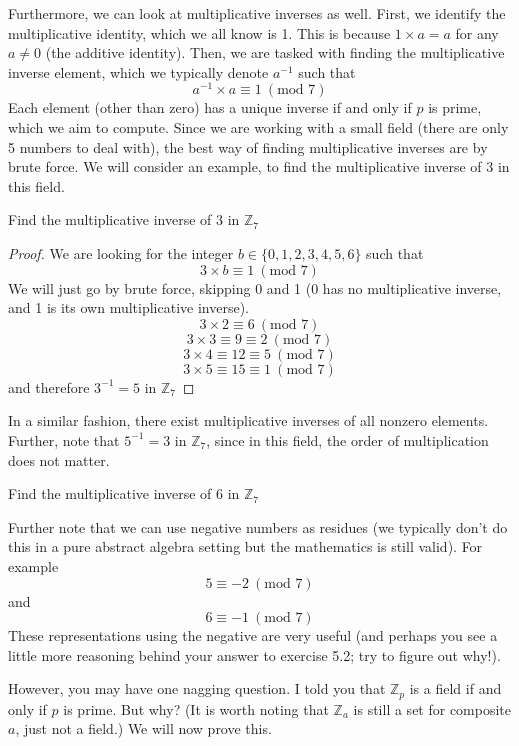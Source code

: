 Furthermore, we can look at multiplicative inverses as well. First, we identify the multiplicative identity, which we all know is 1. This is because $1 \times a = a$ for any $a \neq 0$ (the additive identity). Then, we are tasked with finding the multiplicative inverse element, which we typically denote $a^{-1}$ such that 
\[
a^{-1} \times a \equiv 1 ~ (\text{mod }7)
\]
Each element (other than zero) has a unique inverse if and only if  $p$ is prime, which we aim to compute. Since we are working with a small field (there are only 5 numbers to deal with), the best way of finding multiplicative inverses are by brute force. We will consider an example, to find the multiplicative inverse of $3$ in this field.

\begin{example}
    Find the multiplicative inverse of $3$ in $\mathbb{Z}_7$
\end{example}
\begin{proof}
    We are looking for the integer $b \in \{0, 1, 2, 3, 4, 5, 6\}$ such that 
    \[
    3 \times b \equiv 1~ (\text{mod }7)
    \]
    We will just go by brute force, skipping 0 and 1 (0 has no multiplicative inverse, and 1 is its own multiplicative inverse). 
    \[
    3 \times 2 \equiv 6 ~ (\text{mod }7)
    \]
    \[
    3 \times 3 \equiv 9 \equiv 2 ~ (\text{mod }7)
    \]
    \[
    3 \times 4 \equiv 12 \equiv 5 ~ (\text{mod }7)
    \]
    \[
    3 \times 5 \equiv 15 \equiv 1 ~ (\text{mod }7)
    \]
    and therefore $3^{-1} = 5$ in $\mathbb{Z}_7$
\end{proof}

In a similar fashion, there exist multiplicative inverses of all nonzero elements. Further, note that $5^{-1} = 3$ in $\mathbb{Z}_7$, since in this field, the order of multiplication does not matter.

\begin{exercise}
    Find the multiplicative inverse of $6$ in $\mathbb{Z}_7$
\end{exercise}

Further note that we can use negative numbers as residues (we typically don't do this in a pure abstract algebra setting but the mathematics is still valid). For example
\[
5 \equiv -2 ~ (\text{mod }7)
\]
and 
\[
6 \equiv -1 ~ (\text{mod }7)
\]
These representations using the negative are very useful (and perhaps you see a little more reasoning behind your answer to exercise 5.2; try to figure out why!). 

However, you may have one nagging question. I told you that $\mathbb{Z}_p$ is a field if and only if $p$ is prime. But why? (It is worth noting that $\mathbb{Z}_a$ is still a set for composite $a$, just not a field.) We will now prove this.

